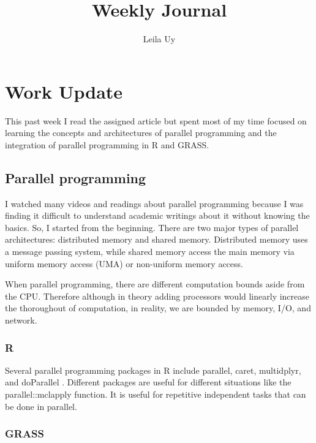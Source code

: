 \documentclass[a4paper,10pt]{article}
\title{Weekly Journal}
\author{Leila Uy}
\begin{document}
\maketitle

% 

\section{Work Update}

This past week I read the assigned article but spent most of my time focused on learning the concepts and architectures of 
parallel programming and the integration of parallel programming in R and GRASS.

\subsection{Parallel programming}
I watched many videos and readings about parallel programming because I was finding it difficult to understand academic
writings about it without knowing the basics. So, I started from the beginning. There are two major types of parallel 
architectures: distributed memory and shared memory. Distributed memory uses a message passing system, while shared memory 
access the main memory via uniform memory access (UMA) or non-uniform memory access. 

When parallel programming, there are different computation bounds aside from the CPU. Therefore although in theory adding
processors would linearly increase the thoroughout of computation, in reality, we are bounded by memory, I/O, and network.

\subsubsection{R}

Several parallel programming packages in R include parallel, caret, multidplyr, and doParallel \cite{jones2017quick, rubia2017multicore}.
Different packages are useful for different situations like the parallel::mclapply function. It is useful for repetitive 
independent tasks that can be done in parallel.  

\subsubsection{GRASS}
\end{document}

